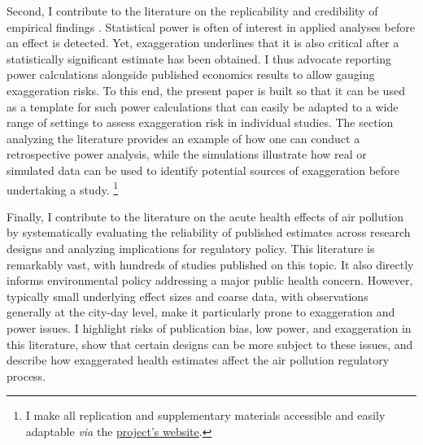 \documentclass[12pt]{article}
\begin{document}
		 Second, I contribute to the literature on the replicability and credibility of empirical findings \citep{button_power_2013, open_science_collaboration_estimating_2015, christensen_transparency_2018, camerer_evaluating_2016, brodeur_methods_2020, brodeur_mass_2024}. Statistical power is often of interest in applied analyses before an effect is detected. Yet, exaggeration underlines that it is also critical after a statistically significant estimate has been obtained. I thus advocate reporting power calculations alongside published economics results to allow gauging exaggeration risks. To this end, the present paper is built so that it can be used as a template for such power calculations that can easily be adapted to a wide range of settings to assess exaggeration risk in individual studies. The section analyzing the literature provides an example of how one can conduct a retrospective power analysis, while the simulations illustrate how real or simulated data can be used to identify potential sources of exaggeration before undertaking a study. \footnote{I make all replication and supplementary materials accessible and easily adaptable \textit{via} the \href{https://vincentbagilet.github.io/inference_pollution/}{project's website}.}
		 
		 Finally, I contribute to the literature on the acute health effects of air pollution by systematically evaluating the reliability of published estimates across research designs and analyzing implications for regulatory policy. This literature is remarkably vast, with hundreds of studies published on this topic. It also directly informs environmental policy addressing a major public health concern. However, typically small underlying effect sizes and coarse data, with observations generally at the city-day level, make it particularly prone to exaggeration and power issues. I highlight risks of publication bias, low power, and exaggeration in this literature, show that certain designs can be more subject to these issues, and describe how exaggerated health estimates affect the air pollution regulatory process.
		 
    
\end{document}
